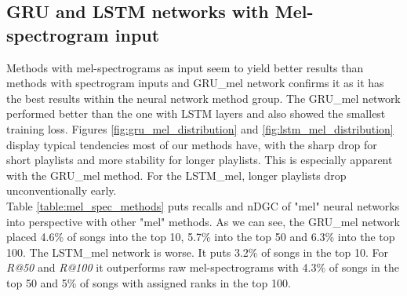 \subsection{GRU and LSTM networks with Mel-spectrogram input}\label{ssec:GRU_LSTM_mel_results}

Methods with mel-spectrograms as input seem to yield better results than methods with spectrogram inputs and GRU\_mel network confirms it as it has the best results within the neural network method group. The GRU\_mel network performed better than the one with LSTM layers and also showed the smallest training loss. Figures \ref{fig:gru_mel_distribution} and \ref{fig:lstm_mel_distribution} display typical tendencies most of our methods have, with the sharp drop for short playlists and more stability for longer playlists. This is especially apparent with the GRU\_mel method. For the LSTM\_mel, longer playlists drop unconventionally early. \\
Table \ref{table:mel_spec_methods} puts recalls and nDGC of "mel" neural networks into perspective with other "mel" methods.
As we can see, the GRU\_mel network placed 4.6\% of songs into the top 10, 5.7\% into the top 50 and 6.3\% into the top 100. The LSTM\_mel network is worse. It puts 3.2\% of songs in the top 10. For \textit{R@50} and \textit{R@100} it outperforms raw mel-spectrograms with 4.3\% of songs in the top 50 and 5\% of songs with assigned ranks in the top 100.

